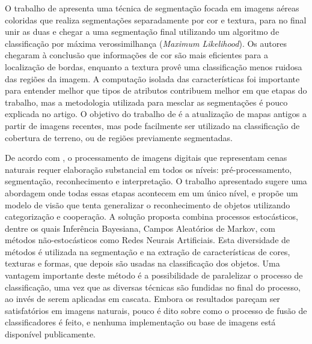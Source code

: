 
O trabalho de  apresenta uma técnica de segmentação focada em imagens aéreas coloridas que realiza segmentações separadamente por cor e textura, para no final unir as duas e chegar a uma segmentação final utilizando um algoritmo de classificação por máxima verossimilhança (\textit{Maximum Likelihood}). Os autores chegaram à conclusão que informações de cor são mais eficientes para a localização de bordas, enquanto a textura provê uma classificação menos ruidosa das regiões da imagem. A computação isolada das características foi importante para entender melhor que tipos de atributos contribuem melhor em que etapas do trabalho, mas a metodologia utilizada para mesclar as segmentações é pouco explicada no artigo. O objetivo do trabalho de  é a atualização de mapas antigos a partir de imagens recentes, mas pode facilmente ser utilizado na classificação de cobertura de terreno, ou de regiões previamente segmentadas.

De acordo com , o processamento de imagens digitais que representam cenas naturais requer elaboração substancial em todos os níveis: pré-processamento, segmentação, reconhecimento e interpretação. O trabalho apresentado sugere uma abordagem onde todas essas etapas acontecem em um único nível, e propõe um modelo de visão que tenta generalizar o reconhecimento de objetos utilizando categorização e cooperação.  A solução proposta combina processos estocásticos, dentre os quais Inferência Bayesiana, Campos Aleatórios de Markov, com métodos não-estocásticos como Redes Neurais Artificiais. Esta diversidade de métodos é utilizada na segmentação e na extração de características de cores, texturas e formas, que depois são usadas na classificação dos objetos. Uma vantagem importante deste método é a possibilidade de paralelizar o processo de classificação, uma vez que as diversas técnicas são fundidas no final do processo, ao invés de serem aplicadas em cascata. Embora os resultados pareçam ser satisfatórios em imagens naturais, pouco é dito sobre como o processo de fusão de classificadores é feito, e nenhuma implementação ou base de imagens está disponível publicamente.

